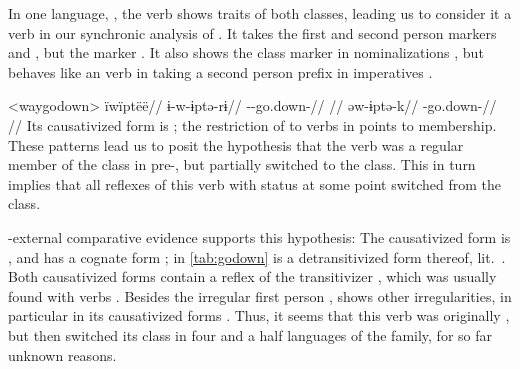 

In one language, \wayana, the verb shows traits of both classes, leading us to consider it a  verb in our synchronic analysis of \wayana.
It takes the first and second person  markers  and  \parencite[200]{wayanatavares2005}, but the  marker  \parencite[206]{wayanatavares2005}.
It also shows the  class marker  in nominalizations , but behaves like an  verb in taking a second person prefix in imperatives .

\pex<waygodown>\wayana \parencite[][200]{wayanatavares2005}
\begingl
\glpreamble ïwïptëë//
\gla ɨ-w-ɨptə-rɨ//
\glb {}--go.down-//
\glft {}//
\endgl
{}
\begingl
\gla əw-ɨptə-k//
\glb {}-go.down-//
\glft {}//
\endgl
\xe
%
Its causativized form is  \parencite[255]{wayanatavares2005}; the restriction of  to  verbs in \PC \parencite{gildea2019overview} points to  membership.
These patterns lead us to posit the hypothesis that the verb was a regular member of the  class in pre-\wayana, but partially switched to the  class.
This in turn implies that all reflexes of this verb with  status at some point switched from the  class.

\wayana-external comparative evidence supports this hypothesis:
The \arara causativized form is  \parencite[66]{alves2017arara}, and \kalina has a cognate form  \parencite[263]{courtz2008carib};   in \cref{tab:godown} is a detransitivized form thereof, lit.\ .
Both causativized forms contain a reflex of the transitivizer , which was usually found with  verbs \parencite{gildea2019overview}.
Besides the irregular first person , \trio {} shows other irregularities, in particular in its causativized forms \parencite[263]{triomeira1999}.
Thus, it seems that this verb was originally , but then switched its class in four and a half languages of the family, for so far unknown reasons.

